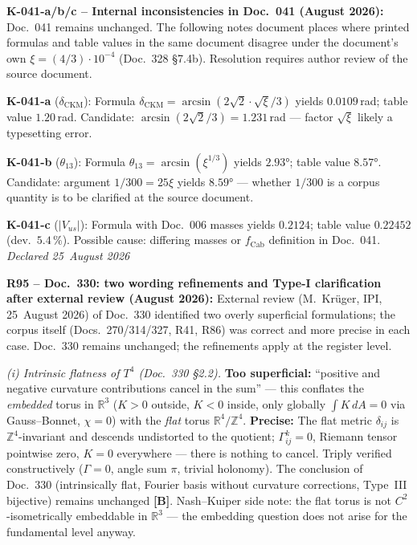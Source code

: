 \medskip

\textbf{K-041-a/b/c -- Internal inconsistencies in Doc.~041 (August 2026):}
Doc.~041 remains unchanged. The following notes document places where
printed formulas and table values in the same document disagree under
the document's own $\xi = (4/3)\cdot10^{-4}$ (Doc.~328 §7.4b).
Resolution requires author review of the source document.

\textbf{K-041-a} ($\delta_\mathrm{CKM}$):
Formula $\delta_\mathrm{CKM} = \arcsin(2\sqrt{2}\cdot\sqrt{\xi}/3)$
yields $0.0109$\,rad; table value $1.20$\,rad.
Candidate: $\arcsin(2\sqrt{2}/3) = 1.231$\,rad --- factor $\sqrt{\xi}$ likely a typesetting error.

\textbf{K-041-b} ($\theta_{13}$):
Formula $\theta_{13} = \arcsin(\xi^{1/3})$ yields $2.93°$; table value $8.57°$.
Candidate: argument $1/300 = 25\xi$ yields $8.59°$ ---
whether $1/300$ is a corpus quantity is to be clarified at the source document.

\textbf{K-041-c} ($|V_{us}|$):
Formula with Doc.~006 masses yields $0.2124$; table value $0.22452$ (dev.\ $5.4\,\%$).
Possible cause: differing masses or $f_\mathrm{Cab}$ definition in Doc.~041.\\
\emph{Declared 25~August 2026}

\medskip

\textbf{R95 -- Doc.~330: two wording refinements and Type-I clarification after external review (August 2026):}
External review (M.~Krüger, IPI, 25~August 2026) of Doc.~330 identified
two overly superficial formulations; the corpus itself
(Docs.~270/314/327, R41, R86) was correct and more precise in each case.
Doc.~330 remains unchanged; the refinements apply at the register level.

\emph{(i) Intrinsic flatness of $T^4$ (Doc.~330 §2.2).}
\textbf{Too superficial:} ``positive and negative curvature contributions
cancel in the sum'' --- this conflates the \emph{embedded} torus in
$\mathbb{R}^3$ ($K>0$ outside, $K<0$ inside, only globally
$\int K\,dA = 0$ via Gauss--Bonnet, $\chi=0$) with the \emph{flat}
torus $\mathbb{R}^4/\mathbb{Z}^4$.
\textbf{Precise:} The flat metric $\delta_{ij}$ is
$\mathbb{Z}^4$-invariant and descends undistorted to the quotient;
$\Gamma^k_{ij}=0$, Riemann tensor pointwise zero, $K=0$ everywhere ---
there is nothing to cancel. Triply verified constructively
($\Gamma=0$, angle sum $\pi$, trivial holonomy).
The conclusion of Doc.~330 (intrinsically flat, Fourier basis without
curvature corrections, Type~III bijective) remains unchanged \textbf{[B]}.
Nash--Kuiper side note: the flat torus is not $C^2$-isometrically
embeddable in $\mathbb{R}^3$ --- the embedding question does not arise
for the fundamental level anyway.


